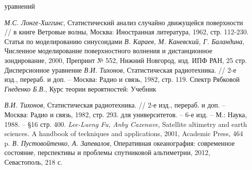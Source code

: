 уравнений
\begin{thebibliography}{}
     \textit{М.С. Лонге-Хиггинс}, Статистический анализ случайно
    движущейся поверхности // в книге Ветровые волны, Москва: Иностранная
    литература, 1962, стр. 112-230.
     Статья по моделированию синусоидами 
     \textit{В. Караев, М. Каневский, Г. Баландина}, Численное
    моделирование поверхностного волнения и дистанционное зондирование, 2000,
    Препринт № 552, Нижний Новгород, изд. ИПФ РАН, 25 стр. 
     Дисперсионное уравнение
     \textit{В.И. Тихонов}, Статистическая радиотехника. // 2-е
    изд., перераб. и доп. -- Москва: Радио и связь, 1982, стр. 119.
     Спектр Рябковой
     \textit{Гнеденко Б.В.}, Курс теории вероятностей: Учебник

     \textit{В.И. Тихонов}, Статистическая радиотехника. // 2-е
    изд., перераб. и доп. -- Москва: Радио и связь, 1982, стр. 293.
    для университетов. -- 6-е изд.  -- М.: Наука, 1988. -- \S 16 
    стр. 400.
     \textit{Lee-Lueng Fu, Anby Cazenave}, Satellite altimetry
    and earth sciences. A handbook of teckniques and applications, 2001,
    Academic Press, 464 p.
     \textit{В. Пустовойтенко, А. Запевалов}, Оперативная
    океанография: современное состояние, перспективы и проблемы спутниковой
    альтиметрии, 2012, Севастополь, 218 с.
    \end{thebibliography}

